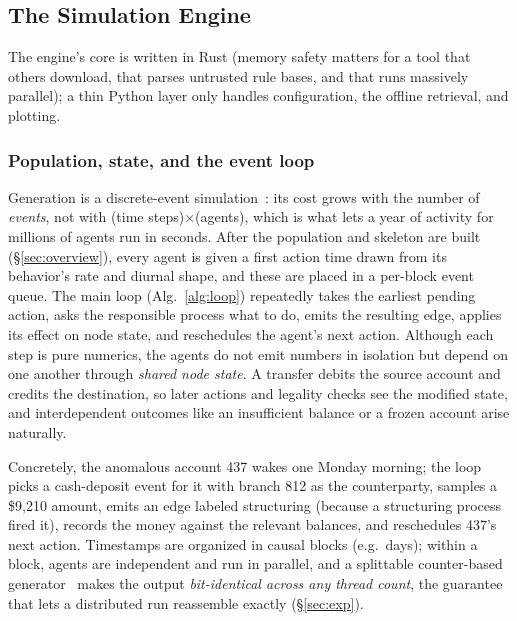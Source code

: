 \documentclass[sigconf,review,anonymous]{acmart}
\begin{document}
\subsection{The Simulation Engine}
\label{sec:engine}
The engine's core is written in Rust (memory safety matters for a tool that others
download, that parses untrusted rule bases, and that runs massively parallel); a thin
Python layer only handles configuration, the offline retrieval, and plotting.

\subsubsection{Population, state, and the event loop}
\label{sec:loop}
Generation is a discrete-event simulation~\cite{banks2010des}: its cost grows with
the number of \emph{events}, not with (time steps)$\times$(agents), which is what
lets a year of activity for millions of agents run in seconds. After the population
and skeleton are built (\S\ref{sec:overview}), every agent is given a first action
time drawn from its behavior's rate and diurnal shape, and these are placed in a
per-block event queue. The main loop (Alg.~\ref{alg:loop}) repeatedly takes the
earliest pending action, asks the responsible process what to do, emits the resulting
edge, applies its effect on node state, and reschedules the agent's next action.
Although each step is pure numerics, the agents do not emit numbers in isolation but
depend on one another through \emph{shared node state}. A
transfer debits the source account and credits the destination, so later actions and
legality checks see the modified state, and interdependent outcomes like an
insufficient balance or a frozen account arise naturally.

Concretely, the anomalous account 437 wakes one Monday morning; the loop picks a
cash-deposit event for it with branch 812 as the counterparty, samples a \$9{,}210
amount, emits an edge labeled \textsf{structuring} (because a structuring process fired
it), records the money against the relevant balances, and reschedules 437's next
action. Timestamps are organized in causal blocks (e.g.\ days); within a block, agents
are independent and run in parallel, and a splittable counter-based
generator~\cite{salmon2011random123} makes the output \emph{bit-identical across any
thread count}, the guarantee that lets a distributed run reassemble exactly
(\S\ref{sec:exp}).
\end{document}
